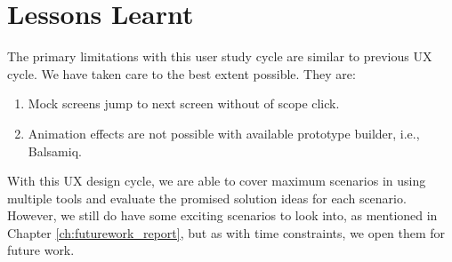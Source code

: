 \section{Lessons Learnt}

The primary limitations with this user study cycle are similar to previous UX cycle. We have taken care to the best extent possible. They are: \\

\begin{enumerate}
\item Mock screens jump to next screen without of scope click.
\item Animation effects are not possible with available prototype builder, i.e., Balsamiq.
\end{enumerate}

With this UX design cycle, we are able to cover maximum scenarios in using multiple tools and evaluate the promised solution ideas for each scenario. However, we still do have some exciting scenarios to look into, as mentioned in Chapter \ref{ch:futurework_report}, but as with time constraints, we open them for future work.
